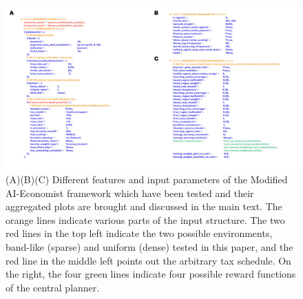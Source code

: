 \documentclass{article}
\begin{document}
\newpage

\begin{figure}[h!]
	\centering
	\includegraphics[width=0.7\linewidth]{"A_Multi-agent_Reinforcement_Learning_Study_of_Emergence_of_Social_Classes_out_of_Arbitrary_Governance_The_Role_of_Environment_Slides_1/A_Multi-agent_Reinforcement_Learning_Study_of_Emergence_of_Social_Classes_out_of_Arbitrary_Governance_The_Role_of_Environment_Slides_1.003"}
	\caption{(A)(B)(C) Different features and input parameters of the Modified AI-Economist framework which have been tested and their aggregated plots are brought and discussed in the main text. The orange lines indicate various parts of the input structure. The two red lines in the top left indicate the two possible environments, band-like (sparse) and uniform (dense) tested in this paper, and the red line in the middle left points out the arbitrary tax schedule. On the right, the four green lines indicate four possible reward functions of the central planner.}
	\label{Figure8}
\end{figure}

\newpage
\end{document}
